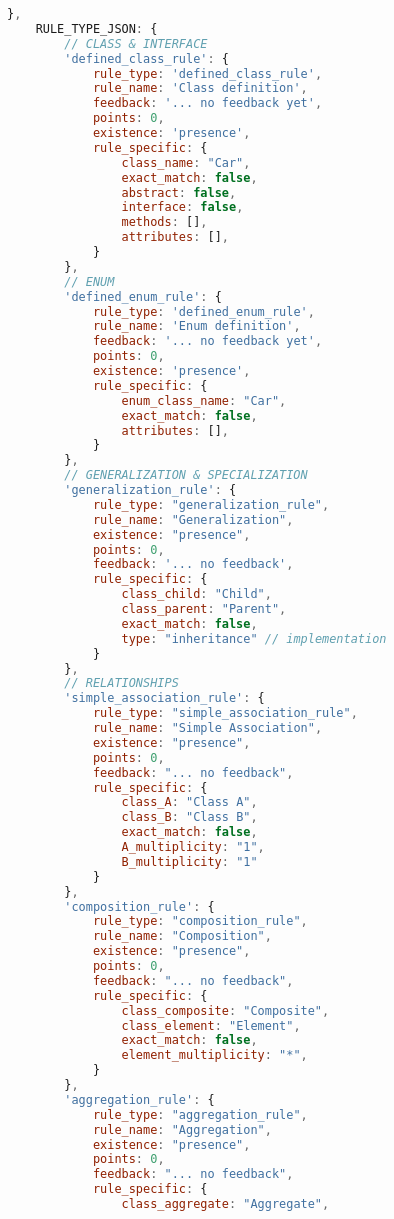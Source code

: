\begin{lstlisting}[caption={Rules Definition JSON}, label={lst:rules_def}, language=javascript]
    },
    RULE_TYPE_JSON: {
        // CLASS & INTERFACE
        'defined_class_rule': {
            rule_type: 'defined_class_rule',
            rule_name: 'Class definition',
            feedback: '... no feedback yet',
            points: 0,
            existence: 'presence',
            rule_specific: {
                class_name: "Car",
                exact_match: false,
                abstract: false,
                interface: false,
                methods: [],
                attributes: [],
            }
        },
        // ENUM
        'defined_enum_rule': {
            rule_type: 'defined_enum_rule',
            rule_name: 'Enum definition',
            feedback: '... no feedback yet',
            points: 0,
            existence: 'presence',
            rule_specific: {
                enum_class_name: "Car",
                exact_match: false,
                attributes: [],
            }
        },
        // GENERALIZATION & SPECIALIZATION
        'generalization_rule': {
            rule_type: "generalization_rule",
            rule_name: "Generalization",
            existence: "presence",
            points: 0,
            feedback: '... no feedback',
            rule_specific: {
                class_child: "Child",
                class_parent: "Parent",
                exact_match: false,
                type: "inheritance" // implementation
            }
        },
        // RELATIONSHIPS
        'simple_association_rule': {
            rule_type: "simple_association_rule",
            rule_name: "Simple Association",
            existence: "presence",
            points: 0,
            feedback: "... no feedback",
            rule_specific: {
                class_A: "Class A",
                class_B: "Class B",
                exact_match: false,
                A_multiplicity: "1",
                B_multiplicity: "1"
            }
        },
        'composition_rule': {
            rule_type: "composition_rule",
            rule_name: "Composition",
            existence: "presence",
            points: 0,
            feedback: "... no feedback",
            rule_specific: {
                class_composite: "Composite",
                class_element: "Element",
                exact_match: false,
                element_multiplicity: "*",
            }
        },
        'aggregation_rule': {
            rule_type: "aggregation_rule",
            rule_name: "Aggregation",
            existence: "presence",
            points: 0,
            feedback: "... no feedback",
            rule_specific: {
                class_aggregate: "Aggregate",

\end{lstlisting}
